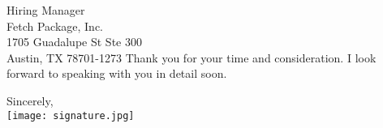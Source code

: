 \documentclass[letterpaper,12pt]{letter}
\begin{document}
\begin{letter}{%
    Hiring Manager \\ 
	Fetch Package, Inc. \\
	1705 Guadalupe St Ste 300 \\
    Austin, TX 78701-1273
}
Thank you for your time and consideration. I look forward to speaking with you in detail soon.

\closing{Sincerely, \\
\vspace{10pt}
\texttt{[image: signature.jpg]}}


\end{letter}

\end{document}
